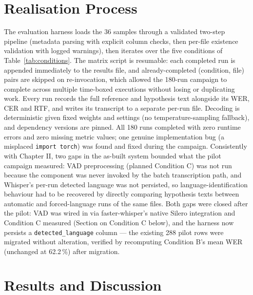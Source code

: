 \documentclass[12pt]{report}
\begin{document}
\section{Realisation Process}
The evaluation harness loads the 36 samples through a validated two-step pipeline (metadata parsing with explicit column checks, then per-file existence validation with logged warnings), then iterates over the five conditions of Table~\ref{tab:conditions}. The matrix script is resumable: each completed run is appended immediately to the results file, and already-completed (condition, file) pairs are skipped on re-invocation, which allowed the 180-run campaign to complete across multiple time-boxed executions without losing or duplicating work. Every run records the full reference and hypothesis text alongside its WER, CER and RTF, and writes its transcript to a separate per-run file. Decoding is deterministic given fixed weights and settings (no temperature-sampling fallback), and dependency versions are pinned. All 180 runs completed with zero runtime errors and zero missing metric values; one genuine implementation bug (a misplaced \texttt{import torch}) was found and fixed during the campaign.
Consistently with Chapter II, two gaps in the as-built system bounded what the pilot campaign measured: VAD preprocessing (planned Condition C) was not run because the component was never invoked by the batch transcription path, and Whisper's per-run detected language was not persisted, so language-identification behaviour had to be recovered by directly comparing hypothesis texts between automatic and forced-language runs of the same files. Both gaps were closed after the pilot: VAD was wired in via faster-whisper's native Silero integration and Condition C measured (Section on Condition C below), and the harness now persists a \texttt{detected\_language} column --- the existing 288 pilot rows were migrated without alteration, verified by recomputing Condition B's mean WER (unchanged at 62.2\,\%) after migration.
\section{Results and Discussion}
\end{document}
